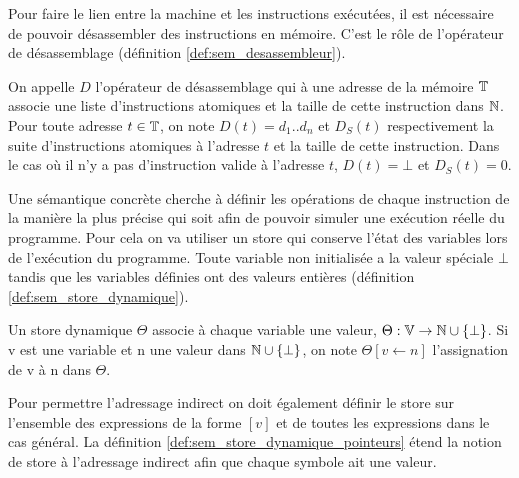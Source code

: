 
% 

Pour faire le lien entre la machine et les instructions exécutées, il est nécessaire de pouvoir désassembler des instructions en mémoire. C'est le rôle de l'opérateur de désassemblage (définition \ref{def:sem_desassembleur}).

\begin{defi}
On appelle $D$ l'opérateur de désassemblage qui à une adresse de la mémoire $\mathbb T$ associe une liste d'instructions atomiques et la taille de cette instruction dans $\mathbb N$.
Pour toute adresse $t\in\mathbb T$, on note $D(t)=d_1..d_n$ et $D_S(t)$ respectivement la suite d'instructions atomiques à l'adresse $t$ et la taille de cette instruction.
Dans le cas où il n'y a pas d'instruction valide à l'adresse $t$, $D(t)=\bot$ et $D_S(t)=0$.
\label{def:sem_desassembleur}
\end{defi}

Une sémantique concrète cherche à définir les opérations de chaque instruction de la manière la plus précise qui soit afin de pouvoir simuler une exécution réelle du programme.
Pour cela on va utiliser un store qui conserve l'état des variables lors de l'exécution du programme.
Toute variable non initialisée a la valeur spéciale $\bot$ tandis que les variables définies ont des valeurs entières (définition \ref{def:sem_store_dynamique}).

\begin{defi}
 Un store dynamique $\Theta$ associe à chaque variable une valeur, $\Theta:\mathbb V\rightarrow\mathbb N\cup\{\bot\}$.
 Si v est une variable et n une valeur dans $\mathbb N\cup\{\bot\}$, on note $\Theta[v\leftarrow n]$ l'assignation de v à n dans $\Theta$.
\label{def:sem_store_dynamique}
\end{defi}

Pour permettre l'adressage indirect on doit également définir le store sur l'ensemble des expressions de la forme $[v]$ et de toutes les expressions dans le cas général.
La définition \ref{def:sem_store_dynamique_pointeurs} étend la notion de store à l'adressage indirect afin que chaque symbole ait une valeur.


